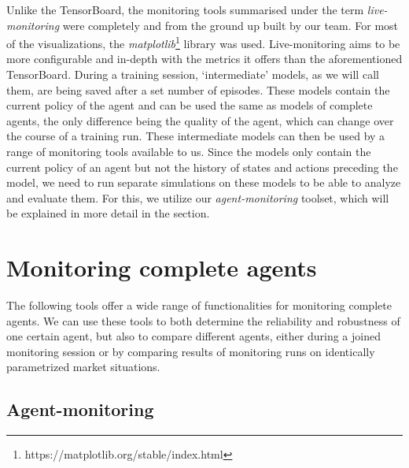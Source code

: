 Unlike the TensorBoard, the monitoring tools summarised under the term \emph{live-monitoring} were completely and from the ground up built by our team. For most of the visualizations, the \emph{matplotlib}\footnote[0][-0.2]{https://matplotlib.org/stable/index.html} library was used. Live-monitoring aims to be more configurable and in-depth with the metrics it offers than the aforementioned TensorBoard.  During a training session, `intermediate' models, as we will call them, are being saved after a set number of episodes.  These models contain the current policy of the agent and can be used the same as models of complete agents, the only difference being the quality of the agent, which can change over the course of a training run. These intermediate models can then be used by a range of monitoring tools available to us. Since the models only contain the current policy of an agent but not the history of states and actions preceding the model, we need to run separate simulations on these models to be able to analyze and evaluate them. For this, we utilize our \emph{agent-monitoring} toolset, which will be explained in more detail in the  section.

\section{Monitoring complete agents}\label{sec:CompleteAgents}

The following tools offer a wide range of functionalities for monitoring complete agents. We can use these tools to both determine the reliability and robustness of one certain agent, but also to compare different agents, either during a joined monitoring session or by comparing results of monitoring runs on identically parametrized market situations.

\subsection*{Agent-monitoring}\label{subsec:AgentMonitoring}


